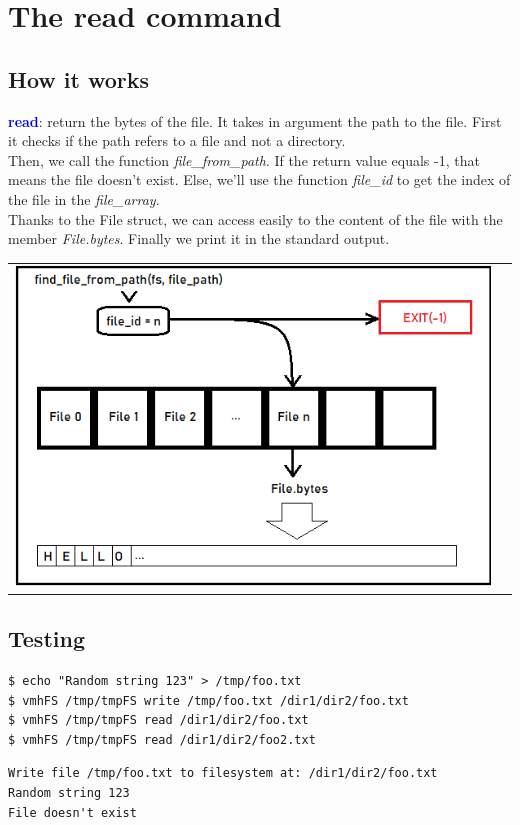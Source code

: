 \section{The read command}

\subsection{How it works}
\textcolor{blue}{\textbf{read}}: return the bytes of the file. It takes in argument the path to the file.
First it checks if the path refers to a file and not a directory.\\

Then, we call the function \textit{file\_from\_path}. If the return value equals -1, that means the file doesn't exist. Else, we'll use the function \textit{file\_id} to get the index of the file in the \textit{file\_array}.\\

Thanks to the File struct, we can access easily to the content of the file with the member \textit{File.bytes}. Finally we print it in the standard output.\\
\begin{center}
    \begin{tabular}{cc}
        \includegraphics{figures/read.png}
    \end{tabular}
\end{center}

\newpage
\subsection{Testing}
\begin{lstlisting}
$ echo "Random string 123" > /tmp/foo.txt
$ vmhFS /tmp/tmpFS write /tmp/foo.txt /dir1/dir2/foo.txt
$ vmhFS /tmp/tmpFS read /dir1/dir2/foo.txt
$ vmhFS /tmp/tmpFS read /dir1/dir2/foo2.txt
\end{lstlisting}

\begin{lstlisting}
Write file /tmp/foo.txt to filesystem at: /dir1/dir2/foo.txt
Random string 123
File doesn't exist
\end{lstlisting}

\newpage